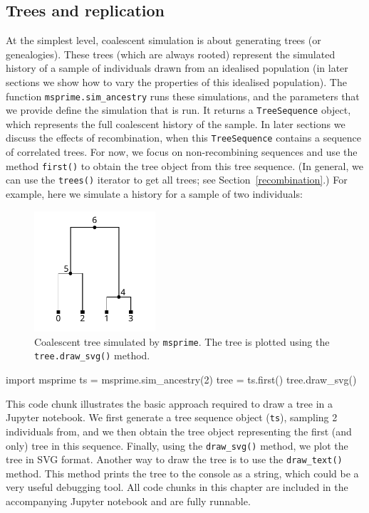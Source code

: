 \documentclass[graybox]{svmult}
\newcommand{\msprime}[0]{\texttt{msprime}}
\begin{document}
\subsection{Trees and replication}
At the simplest level, coalescent simulation is about generating trees (or genealogies).
These trees (which are always rooted) represent the simulated history of a sample of individuals
drawn from an idealised population (in later sections we show how to
vary the properties of this idealised population). The function
\texttt{msprime.sim\_ancestry} runs these simulations, and the parameters
that we provide define the simulation that is
run. It returns a \texttt{TreeSequence} object, which represents the
full coalescent history of the sample. In later sections we discuss the
effects of recombination, when this \texttt{TreeSequence} contains a
sequence of correlated trees. For now, we focus on non-recombining sequences and
use the method \texttt{first()} to obtain the
tree object from this tree sequence. (In general, we can use the \texttt{trees()} iterator
to get all trees; see Section~\ref{recombination}.) For example, here we simulate a
history for a sample of two individuals:

\begin{figure}[t]
\begin{center}
\includegraphics[width=0.4\textwidth]{images/plot_1.pdf}
\end{center}
\caption{\label{fig-simple-tree} Coalescent tree simulated by \msprime.
The tree is plotted using the \texttt{tree.draw\_svg()} method.}
\end{figure}

\begin{pythoncode}
import msprime
ts = msprime.sim_ancestry(2)
tree = ts.first()
tree.draw_svg()
\end{pythoncode}

This code chunk illustrates the basic approach required to draw a tree
in a Jupyter notebook. We first generate a tree sequence object (\texttt{ts}), sampling 2 individuals from,
and we then obtain the tree object representing the first (and only)
tree in this sequence. Finally, using the \texttt{draw\_svg()} method, we plot
the tree in SVG format. Another way to draw the tree is to use the
\texttt{draw\_text()} method. This method prints the tree to the console
as a string, which could be a very useful debugging tool.
All code chunks in this chapter are included in the accompanying Jupyter
notebook and are fully runnable.
\end{document}
